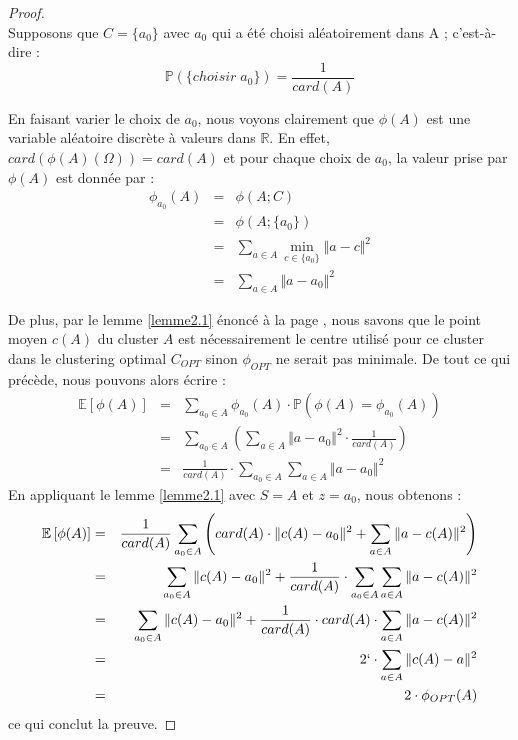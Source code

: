 \documentclass[12pt,a4paper]{book}
\newcommand{\R}{\mathbb{R}}
\newcommand{\E}{\mathbb{E}}
\newcommand{\p}{\mathbb{P}}
\newcommand{\1}{\mathds{1}}
\begin{document}
	\begin{proof}
		~\\
		Supposons que $C=\{ a_0 \}$  avec $a_0$ qui a été choisi aléatoirement dans A ; c'est-à-dire :
		$$
			\p \left( \{ choisir \; a_0  \} \right) = \frac{1}{card(A)}
		$$
		
		En faisant varier le choix de $a_0$, nous voyons clairement que $\phi(A)$ est une variable aléatoire discrète à valeurs dans $\R$. En effet, $card\left(\phi(A)\left(\Omega\right)\right) = card(A)$ et pour chaque choix de $a_0$, la valeur prise par $\phi(A)$ est donnée par :
		\begin{eqnarray*}
			\phi_{a_0}(A) &=& \phi\left(A;C\right) \\
			&=& \phi\left(A;\{a_0\}\right) \\
			&=& \sum_{a \in A} \min_{c \in \{ a_0 \}} \Vert a - c \Vert^2 \\
			&=& \sum_{a \in A} \Vert a - a_0 \Vert^2
		\end{eqnarray*}
		
		De plus, par le lemme \ref{lemme2.1} énoncé à la page \pageref{lemme2.1}, nous savons que le point moyen $c(A)$ du cluster $A$ est nécessairement le centre utilisé pour ce cluster dans le clustering optimal $C_{OPT}$ sinon $\phi_{OPT}$ ne serait pas minimale.
		De tout ce qui précède, nous pouvons alors écrire :
		\begin{eqnarray*}
			\E\left[\phi(A)\right] &=& \sum_{a_0 \in A} \phi_{a_0}(A) \cdot \p \left( \phi(A)= \phi_{a_0}(A) \right) \\
			&=& \sum_{a_0 \in A} \left( \sum_{a \in A} \Vert a-a_0 \Vert^2 \cdot \frac{1}{card(A)} \right) \\
			&=& \frac{1}{card(A)} \cdot \sum_{a_0 \in A} \sum_{a \in A} \Vert a-a_0 \Vert^2
		\end{eqnarray*}
		En appliquant le lemme \ref{lemme2.1} avec $S=A$ et $z=a_0$, nous obtenons :
		\begin{eqnarray*}
			\E\left[\phi(A)\right] &=& \frac{1}{card(A)} \sum_{a_0 \in A} \left( card(A) \cdot \Vert c(A)-a_0 \Vert^2 + \sum_{a \in A} \Vert a - c(A) \Vert^2 \right) \\
			&=& \sum_{a_0 \in A} \Vert c(A)-a_0 \Vert^2 + \frac{1}{card(A)} \cdot \sum_{a_0 \in A} \sum_{a \in A}\Vert a - c(A) \Vert^2 \\
			&=& \sum_{a_0 \in A} \Vert c(A)-a_0 \Vert^2 + \frac{1}{card(A)} \cdot card(A) \cdot \sum_{a \in A}\Vert a - c(A) \Vert^2 \\
			&=& 2 `\cdot \sum_{a \in A} \Vert c(A) - a \Vert^2 \\
			&=& 2 \cdot \phi_{OPT}(A)
		\end{eqnarray*}
		ce qui conclut la preuve.
	\end{proof}
\end{document}
